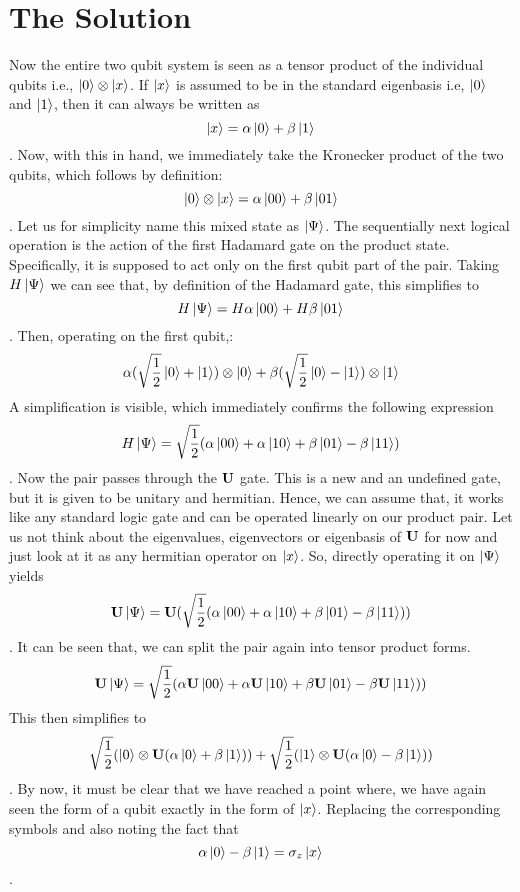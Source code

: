 \section{The Solution}
Now the entire two qubit system is seen as a tensor product of the individual qubits i.e., $\left| 0 \right> \otimes \left| x \right>$. If $\left| x \right>$ is assumed to be in the standard eigenbasis i.e, $\left| 0 \right>$ and $\left| 1 \right>$, then it can always be written as $$\left| x \right> = \alpha\left| 0 \right> + \beta\left| 1 \right>$$. Now, with this in hand, we immediately take the Kronecker product of the two qubits, which follows by definition: $$\left| 0 \right> \otimes \left| x \right> = \alpha\left| 00 \right> + \beta\left| 01 \right>$$. Let us for simplicity name this mixed state as $\left| \Psi \right>$. The sequentially next logical operation is the action of the first Hadamard gate on the product state. Specifically, it is supposed to act only on the first qubit part of the pair. Taking $H\left| \Psi \right>$ we can see that, by definition of the Hadamard gate, this simplifies to $$H\left| \Psi \right> = H\alpha\left| 00 \right> +H \beta\left| 01 \right>$$. Then, operating on the first qubit,: $$\alpha(\sqrt{\frac{1}{2}}\left| 0 \right>+\left| 1 \right>) \otimes \left| 0 \right> + \beta(\sqrt{\frac{1}{2}}\left| 0 \right>-\left| 1 \right>) \otimes \left| 1 \right>$$
 A simplification is visible, which immediately confirms the following expression $$H\left| \Psi \right> = \sqrt{\frac{1}{2}}(\alpha\left| 00 \right>+\alpha\left| 10 \right> + \beta\left| 01 \right> - \beta\left| 11 \right>)$$. Now the pair passes through the $\mathbf{U}$ gate. This is a new and an undefined gate, but it is given to be unitary and hermitian. Hence, we can assume that, it works like any standard logic gate and can be operated linearly on our product pair. Let us not think about the eigenvalues, eigenvectors or eigenbasis of $\mathbf{U}$ for now and just look at it as any hermitian operator on $\left| x \right>$. So, directly operating it on $\left| \Psi \right>$ yields $$ \mathbf{U}\left| \Psi \right> = \mathbf{U}( \sqrt{\frac{1}{2}}(\alpha\left| 00 \right>+\alpha\left| 10 \right> + \beta\left| 01 \right> - \beta\left| 11 \right>))$$. It can be seen that, we can split the pair again into tensor product forms.  $$ \mathbf{U}\left| \Psi \right> =  \sqrt{\frac{1}{2}}(\alpha\mathbf{U}\left| 00 \right>+\alpha\mathbf{U}\left| 10 \right> + \beta\mathbf{U}\left| 01 \right> - \beta\mathbf{U}\left| 11 \right>))$$
This then simplifies to $$\sqrt{\frac{1}{2}}(\left| 0 \right> \otimes \mathbf{U}(\alpha\left| 0 \right> + \beta\left| 1 \right>)) + \sqrt{\frac{1}{2}}(\left| 1 \right> \otimes \mathbf{U}(\alpha\left| 0 \right> - \beta\left| 1 \right>))$$. By now, it must be clear that we have reached a point where, we have again seen the form of a qubit exactly in the form of $\left| x \right>$. Replacing the corresponding symbols and also noting the fact that $$\alpha\left| 0 \right> - \beta\left| 1 \right> = \sigma_{z}\left| x \right>$$.